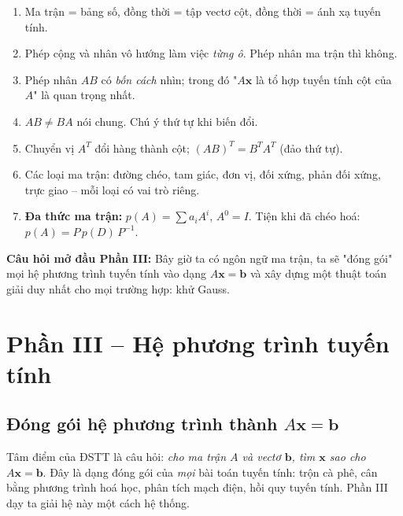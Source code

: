 \documentclass[12pt,a4paper]{article}
\begin{document}
\begin{tongket}[title={Tổng kết Phần II}]
\begin{enumerate}
  \item Ma trận = bảng số, đồng thời = tập vectơ cột, đồng thời = ánh xạ tuyến tính.
  \item Phép cộng và nhân vô hướng làm việc \emph{từng ô}. Phép nhân ma trận thì không.
  \item Phép nhân $AB$ có \emph{bốn cách} nhìn; trong đó "$A\mathbf{x}$ là tổ hợp tuyến tính cột của $A$" là quan trọng nhất.
  \item $AB \ne BA$ nói chung. Chú ý thứ tự khi biến đổi.
  \item Chuyển vị $A^T$ đổi hàng thành cột; $(AB)^T = B^T A^T$ (đảo thứ tự).
  \item Các loại ma trận: đường chéo, tam giác, đơn vị, đối xứng, phản đối xứng, trực giao -- mỗi loại có vai trò riêng.
  \item \textbf{Đa thức ma trận:} $p(A) = \sum a_i A^i$, $A^0 = I$. Tiện khi đã chéo hoá: $p(A) = P\,p(D)\,P^{-1}$.
\end{enumerate}

\textbf{Câu hỏi mở đầu Phần III:} Bây giờ ta có ngôn ngữ ma trận, ta sẽ "đóng gói" mọi hệ phương trình tuyến tính vào dạng $A\mathbf{x} = \mathbf{b}$ và xây dựng một thuật toán giải duy nhất cho mọi trường hợp: khử Gauss.
\end{tongket}

\newpage

\section{Phần III -- Hệ phương trình tuyến tính}

\subsection{Đóng gói hệ phương trình thành $A\mathbf{x} = \mathbf{b}$}

\begin{dongco}
Tâm điểm của ĐSTT là câu hỏi: \emph{cho ma trận $A$ và vectơ $\mathbf{b}$, tìm $\mathbf{x}$ sao cho $A\mathbf{x} = \mathbf{b}$}. Đây là dạng đóng gói của \emph{mọi} bài toán tuyến tính: trộn cà phê, cân bằng phương trình hoá học, phân tích mạch điện, hồi quy tuyến tính. Phần III dạy ta giải hệ này một cách hệ thống.
\end{dongco}
\end{document}
